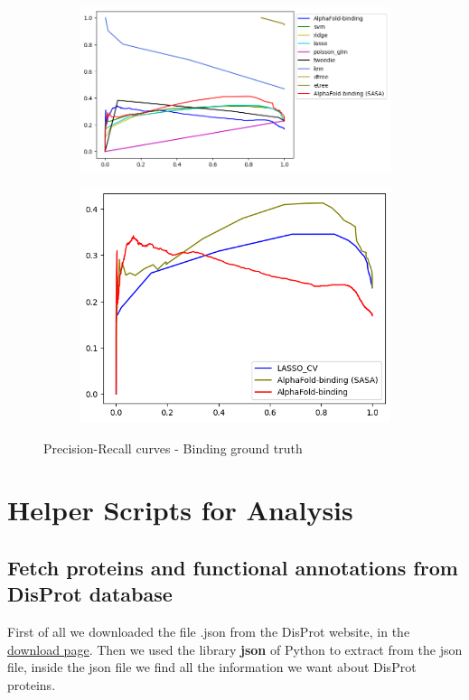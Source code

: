 \begin{figure}[h!]
    \begin{subfigure}{1.1\linewidth}
        \includegraphics[width=\linewidth]{res/ML/precisionrecall-binding-total.png}
    \end{subfigure}
    
    \begin{subfigure}{0.8\linewidth}
        \includegraphics[width=\linewidth]{res/ML/precisionrecall-binding.png}
    \end{subfigure}
    \caption{Precision-Recall curves - Binding ground truth}
\end{figure}

\pagebreak

\section{Helper Scripts for Analysis}\label{analysis-procedures}
\subsection{Fetch proteins and functional annotations from DisProt database}
First of all we downloaded the file .json from the DisProt website, in the \href{https://disprot.org/download}{\underline{download page}}. Then we used the library \textbf{json} of Python to extract from the json file, inside the json file we find all the information we want about DisProt proteins. 

